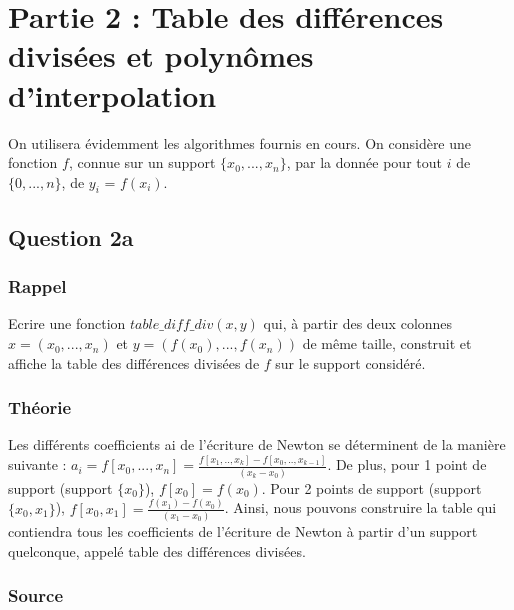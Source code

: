 \documentclass[a4paper,10pt]{report}
\begin{document}


\chapter*{Partie 2 : Table des différences divisées et polynômes d’interpolation}

On utilisera évidemment les algorithmes fournis en cours. On considère une
fonction $f$, connue sur un support $\lbrace x_{0},...,x_{n}\rbrace$, par la donnée pour tout $i$ de $\lbrace 0,...,n \rbrace$, de $y_{i}$ = $f(x_{i})$.

\section*{Question 2a}

\subsection*{Rappel}

Ecrire une fonction $table\_diff\_div(x, y)$ qui, à partir des deux colonnes $x = (x_{0},...,x_{n})$ et $y = (f(x_{0}),...,f(x_{n}))$ de même taille, construit et affiche la table des différences divisées de $f$ sur le support considéré.

\subsection*{Théorie}

Les différents coefficients ai de l’écriture de Newton se déterminent de la manière suivante : $a_{i} = f[x_{0},...,x_{n}] = \frac{f[x_{1},..,x_{k}]-f[x_{0},..,x_{k-1}]}{(x_{k}-x_{0})}$.
De plus, pour 1 point de support (support $\lbrace x_{0} \rbrace$), $f[x_{0}] = f(x_{0})$.
Pour 2 points de support (support $\lbrace x_{0},x_{1} \rbrace$), $f[x_{0},x_{1}] = \frac{f(x_{1})-f(x_{0})}{(x_{1}-x_{0})}$.
Ainsi, nous pouvons construire la table qui contiendra tous les coefficients de l’écriture de Newton à partir d’un support quelconque, appelé table des différences divisées.

\newpage
\subsection*{Source}
\end{document}
